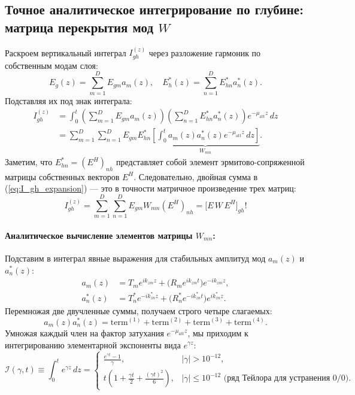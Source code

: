\documentclass[a4paper,11pt]{article}
\begin{document}
\subsection{Точное аналитическое интегрирование по глубине: матрица перекрытия мод \texorpdfstring{$W$}{W}}

Раскроем вертикальный интеграл $I_{gh}^{(z)}$ через разложение гармоник по собственным модам слоя:
\begin{equation}
    E_g(z) = \sum_{m=1}^D E_{gm} a_m(z), \quad E_h^*(z) = \sum_{n=1}^D E_{hn}^* a_n^*(z).
\end{equation}
Подставляя их под знак интеграла:
\begin{align}
    I_{gh}^{(z)} &= \int_0^t \left( \sum_{m=1}^D E_{gm} a_m(z) \right) \left( \sum_{n=1}^D E_{hn}^* a_n^*(z) \right) e^{-\mu_{\text{att}} z} \, dz \nonumber \\
    &= \sum_{m=1}^D \sum_{n=1}^D E_{gm} E_{hn}^* \underbrace{\left[ \int_0^t a_m(z) a_n^*(z) e^{-\mu_{\text{att}} z} \, dz \right]}_{W_{mn}}.
    \label{eq:I_gh_expansion}
\end{align}
Заметим, что $E_{hn}^* = (E^H)_{nh}$ представляет собой элемент эрмитово-сопряженной матрицы собственных векторов $E^H$. 
Следовательно, двойная сумма в (\ref{eq:I_gh_expansion}) — это в точности матричное произведение трех матриц:
\begin{equation}
    I_{gh}^{(z)} = \sum_{m=1}^D \sum_{n=1}^D E_{gm} W_{mn} (E^H)_{nh} = \big[ E \, W \, E^H \big]_{gh}!
    \label{eq:matrix_VWV}
\end{equation}

\paragraph{Аналитическое вычисление элементов матрицы $W_{mn}$:}
Подставим в интеграл явные выражения для стабильных амплитуд мод $a_m(z)$ и $a_n^*(z)$:
\begin{align}
    a_m(z) &= T_m e^{i k_{zm} z} + \big(R_m e^{i k_{zm} t}\big) e^{-i k_{zm} z}, \\
    a_n^*(z) &= T_n^* e^{-i k_{zn}^* z} + \big(R_n^* e^{-i k_{zn}^* t}\big) e^{i k_{zn}^* z}.
\end{align}
Перемножая две двучленные суммы, получаем строго четыре слагаемых:
\begin{equation}
    a_m(z) a_n^*(z) = \text{term}^{(1)} + \text{term}^{(2)} + \text{term}^{(3)} + \text{term}^{(4)}.
\end{equation}
Умножая каждый член на фактор затухания $e^{-\mu_{\text{att}} z}$, мы приходим к интегрированию элементарной экспоненты вида $e^{\gamma z}$:
\begin{equation}
    \mathcal{I}(\gamma, t) \equiv \int_0^t e^{\gamma z} \, dz = \begin{cases}
        \displaystyle\frac{e^{\gamma t} - 1}{\gamma}, & |\gamma| > 10^{-12}, \\[1em]
        \displaystyle t \left( 1 + \frac{\gamma t}{2} + \frac{(\gamma t)^2}{6} \right), & |\gamma| \le 10^{-12} \text{ (ряд Тейлора для устранения $0/0$)}.
    \end{cases}
\end{equation}
\end{document}
